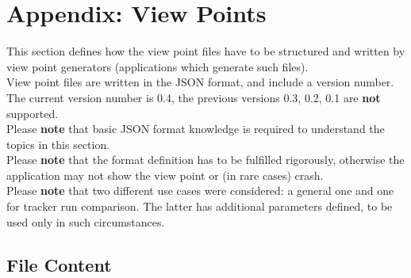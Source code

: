 \section{Appendix: View Points}
\label{sec:appendix_view_points} 

This section defines how the view point files have to be structured and written by view point generators (applications which generate such files). \\

View point files are written in the JSON format, and include a version number. The current version number is 0.4, the previous versions 0.3, 0.2, 0.1 are \textbf{not} supported. \\

Please \textbf{note} that basic JSON format knowledge is required to understand the topics in this section. \\

Please \textbf{note} that the format definition has to be fulfilled rigorously, otherwise the application may not show the view point or (in rare cases) crash. \\

Please \textbf{note} that two different use cases were considered: a general one and one for tracker run comparison. The latter has additional parameters defined, to be used only in such circumstances.

\subsection{File Content}


